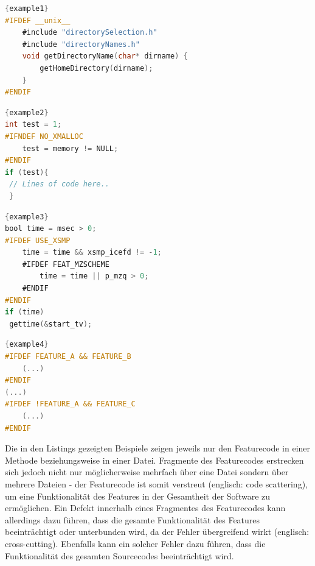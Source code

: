 \noindent\begin{minipage}{.45\textwidth}
\begin{lstlisting}[caption=Beispieleinsatz von \texttt{\#IFDEF} nach \cite{Preschern2019},frame=tlrb,language=C, label=example1]{example1}
#IFDEF __unix__
	#include "directorySelection.h"
	#include "directoryNames.h"
	void getDirectoryName(char* dirname) {
		getHomeDirectory(dirname);
	}
#ENDIF
\end{lstlisting}
\end{minipage}\hfill
\begin{minipage}{.45\textwidth}
\begin{lstlisting}[caption=Beispieleinsatz von \texttt{\#IFNDEF} nach \cite{Medeiros2018},frame=tlrb,language=C, label=example2]{example2}
int test = 1;
#IFNDEF NO_XMALLOC
	test = memory != NULL;
#ENDIF
if (test){
 // Lines of code here..
 } 
\end{lstlisting}
\end{minipage}

\noindent\begin{minipage}{.45\textwidth}
\begin{lstlisting}[caption=Beispiel eines verschachtelten Einsatzes von \texttt{\#IFDEF} nach \cite{Medeiros2018} ,frame=tlrb,language=C, label=example3, firstnumber=1]{example3}
bool time = msec > 0;
#IFDEF USE_XSMP
	time = time && xsmp_icefd != -1;
	#IFDEF FEAT_MZSCHEME
 		time = time || p_mzq > 0;
	#ENDIF
#ENDIF
if (time)
 gettime(&start_tv);
\end{lstlisting}
\end{minipage}\hfill
\begin{minipage}{.45\textwidth}
\begin{lstlisting}[caption=Beispiele von erweiterten Bedingungen nach \cite{Queiroz2015},frame=tlrb,language=C, label=example4, firstnumber=1]{example4}
#IFDEF FEATURE_A && FEATURE_B
	(...)
#ENDIF
(...)
#IFDEF !FEATURE_A && FEATURE_C
	(...)
#ENDIF
\end{lstlisting}
\end{minipage}

Die in den Listings gezeigten Beispiele zeigen jeweils nur den Featurecode in einer Methode beziehungsweise in einer Datei. Fragmente des Featurecodes erstrecken sich jedoch nicht nur möglicherweise mehrfach über eine Datei sondern über mehrere Dateien - der Featurecode ist somit verstreut (englisch: code scattering), um eine Funktionalität des Features in der Gesamtheit der Software zu ermöglichen. Ein Defekt innerhalb eines Fragmentes des Featurecodes kann allerdings dazu führen, dass die gesamte Funktionalität des Features beeinträchtigt oder unterbunden wird, da der Fehler übergreifend wirkt (englisch: cross-cutting). Ebenfalls kann ein solcher Fehler dazu führen, dass die Funktionalität des gesamten Sourcecodes beeinträchtigt wird.

